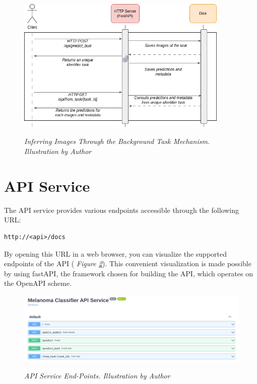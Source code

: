 \begin{figure}[H]
  \centering
  \includegraphics[width=0.9\textwidth]{imatges/preliminaries/BackgroundTask.drawio.png}
  \caption[Inferring Images Through the Background Task Mechanism]{\textit{Inferring Images Through the Background Task Mechanism.  Illustration by Author}}
  {\label{fig:backgrond-task}}
\end{figure}

\newpage

\section{API Service}

The API service provides various endpoints accessible through the following URL:

\begin{Verbatim}[fontsize=\scriptsize]
http://<api>/docs
\end{Verbatim}

By opening this URL in a web browser, you can visualize the supported endpoints of the API
( \textit{Figure \ref{fig:api-endpoints}}). This convenient visualization is made possible by using fastAPI,
the framework chosen for building the API, which operates on the OpenAPI scheme.

\begin{figure}[H]
  \centering
  \begin{adjustbox}{width=\textwidth, trim={0.2cm 0cm 0.1cm 0cm}, clip}
    \includegraphics[width=\textwidth]{imatges/results/api-endpoints.png}
  \end{adjustbox}
  \caption[API Service End-Points]{\textit{API Service End-Points. Illustration by Author}}
  {\label{fig:api-endpoints}}
\end{figure}

